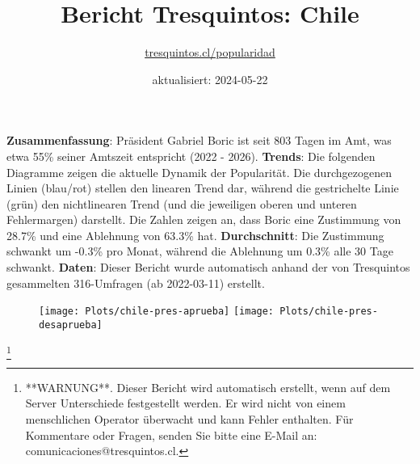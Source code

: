 \documentclass[
]{article}
\title{Bericht Tresquintos: Chile}
\subtitle{\href{https://tresquintos.cl}{tresquintos.cl/popularidad}}
\author{}
\date{\vspace{-2.5em}aktualisiert: 2024-05-22}
\begin{document}
\maketitle

\addtolength{\headheight}{1.0cm} 
\pagestyle{fancy} 
\renewcommand{\headrulewidth}{0pt}

\textbf{Zusammenfassung}: Präsident Gabriel Boric ist seit 803 Tagen im
Amt, was etwa 55\% seiner Amtszeit entspricht (2022 - 2026).
\textbf{Trends}: Die folgenden Diagramme zeigen die aktuelle Dynamik der
Popularität. Die durchgezogenen Linien (blau/rot) stellen den linearen
Trend dar, während die gestrichelte Linie (grün) den nichtlinearen Trend
(und die jeweiligen oberen und unteren Fehlermargen) darstellt. Die
Zahlen zeigen an, dass Boric eine Zustimmung von 28.7\% und eine
Ablehnung von 63.3\% hat. \textbf{Durchschnitt}: Die Zustimmung schwankt
um -0.3\% pro Monat, während die Ablehnung um 0.3\% alle 30 Tage
schwankt. \textbf{Daten}: Dieser Bericht wurde automatisch anhand der
von Tresquintos gesammelten 316-Umfragen (ab 2022-03-11) erstellt.

\begin{figure}

{\centering \texttt{[image: Plots/chile-pres-aprueba]} \texttt{[image: Plots/chile-pres-desaprueba]} 

}

\end{figure}

\let\thefootnote\relax

\footnote{**WARNUNG**. Dieser Bericht wird automatisch erstellt, wenn auf dem Server Unterschiede festgestellt werden. Er wird nicht von einem menschlichen Operator überwacht und kann Fehler enthalten. Für Kommentare oder Fragen, senden Sie bitte eine E-Mail an: comunicaciones@tresquintos.cl.}
\end{document}
